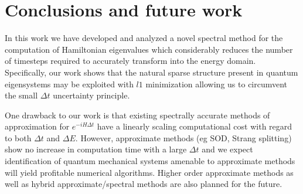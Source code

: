 \documentclass[11pt]{amsart}
\theoremstyle{remark}
\begin{document}
\section{Conclusions and future work}
In this work we have developed and analyzed a novel spectral method for the computation of Hamiltonian eigenvalues which considerably reduces the number of timesteps required to accurately transform into the energy domain. Specifically, our work shows that the natural sparse structure present in quantum eigensystems may be exploited with $l1$ minimization allowing us to circumvent the small $\Delta t$ uncertainty principle.

One drawback to our work is that existing spectrally accurate methods of approximation for $e^{-iH\Delta t}$ have a linearly scaling computational cost with regard to both $\Delta t$ and $\Delta E$. However, approximate methods (eg SOD, Strang splitting) show no increase in computation time with a large $\Delta t$ and we expect identification of quantum mechanical systems amenable to approximate methods will yield profitable numerical algorithms. Higher order approximate methods as well as hybrid approximate/spectral methods are also planned for the future.




\end{document}
